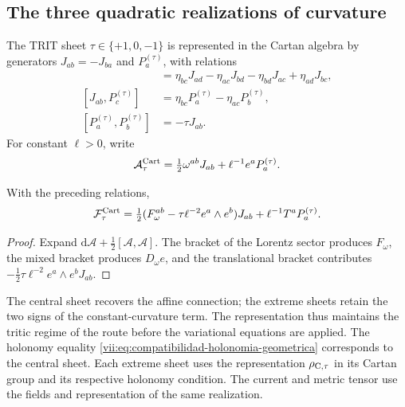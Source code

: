 \subsection{The three quadratic realizations of curvature}

The TRIT sheet \(\tau\in\{+1,0,-1\}\) is represented in
the Cartan algebra by generators \(J_{ab}=-J_{ba}\)
and \(P_a^{(\tau)}\), with relations
\begin{align*}
 [J_{ab},J_{cd}]&=
 \eta_{bc}J_{ad}-\eta_{ac}J_{bd}
 -\eta_{bd}J_{ac}+\eta_{ad}J_{bc},\\
 [J_{ab},P_c^{(\tau)}]&=
 \eta_{bc}P_a^{(\tau)}-\eta_{ac}P_b^{(\tau)},\\
 [P_a^{(\tau)},P_b^{(\tau)}]&=-\tau J_{ab}.
\end{align*}
For constant \(\ell>0\), write
\[
 \mathcal A_\tau^{\rm Cart}
 =\tfrac12\omega^{ab}J_{ab}+\ell^{-1}e^aP_a^{(\tau)}.
\]

\begin{proposition}
\label{vii:prop:curvatura-tritificada}
With the preceding relations,
\begin{equation}
 \mathcal F_\tau^{\rm Cart}
 =\tfrac12(F_\omega^{ab}-\tau\ell^{-2}e^a\wedge e^b)J_{ab}
     +\ell^{-1}T^aP_a^{(\tau)}.
 \label{vii:eq:curvatura-tritificada}
\end{equation}
\end{proposition}
\begin{proof}
Expand \(\mathrm d\mathcal A+\tfrac12[\mathcal A,\mathcal A]\).
The bracket of the Lorentz sector produces \(F_\omega\), the
mixed bracket produces \(D_\omega e\), and the translational
bracket contributes
\(-\tfrac12\tau\ell^{-2}e^a\wedge e^bJ_{ab}\).
\end{proof}

The central sheet recovers the affine connection; the extreme sheets
retain the two signs of the constant-curvature term. The representation
thus maintains the tritic regime of the route before the variational
equations are applied. The holonomy equality
\eqref{vii:eq:compatibilidad-holonomia-geometrica} corresponds to the
central sheet. Each extreme sheet uses the representation
\(\rho_{{\rm C},\tau}\) in its Cartan group and its respective
holonomy condition. The current and metric tensor use the fields and
representation of the same realization.
